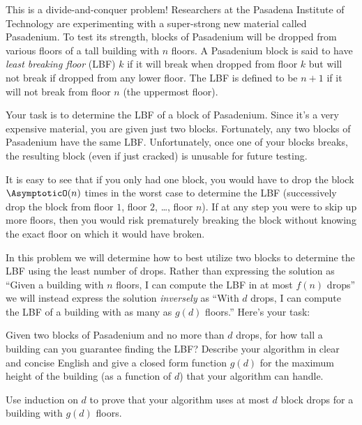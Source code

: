 \documentclass{ks-pset}
\begin{document}
\begin{problem}[Pasadenium!, 60]

  This is a divide-and-conquer problem!  Researchers at the Pasadena Institute
  of Technology are experimenting with a super-strong new material called
  Pasadenium.  To test its strength, blocks of Pasadenium will be dropped from
  various floors of  a tall building with \(n\) floors.  A Pasadenium block is
  said to have \emph{least breaking floor} (LBF) \(k\) if it will break when
  dropped from floor \(k\) but will not break if dropped from any lower floor.
  The LBF is defined to be \(n+1\) if it will not break from floor \(n\) (the
  uppermost floor).

  Your task is to determine the LBF of a block of Pasadenium.  Since it's a
  very expensive material, you are given just two blocks.  Fortunately, any two
  blocks of Pasadenium have the same LBF. Unfortunately, once one of your
  blocks breaks, the resulting block (even if just cracked) is unusable for
  future testing.

  It is easy to see that if you only had one block, you would have to drop the
  block \(\AsymptoticO(n)\) times in the worst case to determine the LBF
  (successively drop the block from floor \(1\), floor \(2\), …, floor \(n\)).
  If at any step you were to skip up more floors, then you would risk
  prematurely breaking the block without knowing the exact floor on which it
  would have broken.

  In this problem we will determine how to best utilize two blocks to determine
  the LBF using the least number of drops. Rather than expressing the solution
  as ``Given a building with \(n\) floors, I can compute the LBF in at most
  \(f(n)\) drops'' we will instead express the solution \emph{inversely} as
  ``With \(d\) drops, I can compute the LBF of a building with as many as
  \(g(d)\) floors.''  Here's your task:

	\begin{subproblems}

    \item \label{part:gd} Given two blocks of Pasadenium and no more than \(d\)
      drops, for how tall a building can you guarantee finding the LBF?
      Describe your algorithm in clear and concise English and give a closed
      form function \(g(d)\) for the maximum height of the building (as a
      function of \(d\)) that your algorithm can handle.

    \item Use induction on \(d\) to prove that your algorithm uses at most
      \(d\) block drops for a building with \(g(d)\) floors.


\end{subproblems}
\end{problem}
\end{document}
